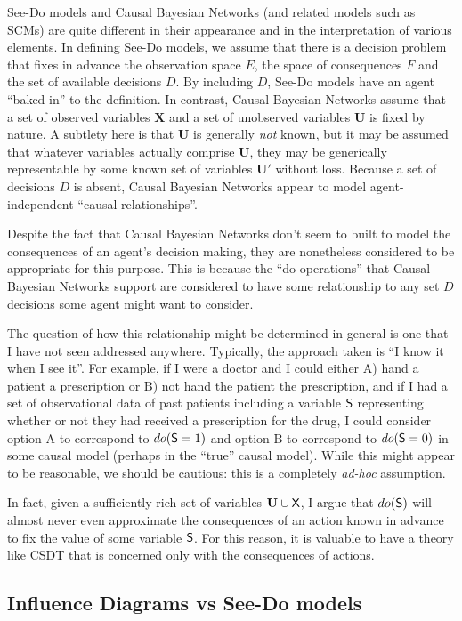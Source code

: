 See-Do models and Causal Bayesian Networks (and related models such as SCMs) are quite different in their appearance and in the interpretation of various elements. In defining See-Do models, we assume that there is a decision problem that fixes in advance the observation space $E$, the space of consequences $F$ and the set of available decisions $D$. By including $D$, See-Do models have an agent ``baked in'' to the definition. In contrast, Causal Bayesian Networks assume that a set of observed variables $\mathbf{X}$ and a set of unobserved variables $\mathbf{U}$ is fixed by nature. A subtlety here is that $\mathbf{U}$ is generally \emph{not} known, but it may be assumed that whatever variables actually comprise $\mathbf{U}$, they may be generically representable by some known set of variables $\mathbf{U}'$ without loss. Because a set of decisions $D$ is absent, Causal Bayesian Networks appear to model agent-independent ``causal relationships''.

Despite the fact that Causal Bayesian Networks don't seem to built to model the consequences of an agent's decision making, they are nonetheless considered to be appropriate for this purpose. This is because the ``do-operations'' that Causal Bayesian Networks support are considered to have some relationship to any set $D$ decisions some agent might want to consider.

The question of how this relationship might be determined in general is one that I have not seen addressed anywhere. Typically, the approach taken is ``I know it when I see it''. For example, if I were a doctor and I could either A) hand a patient a prescription or B) not hand the patient the prescription, and if I had a set of observational data of past patients including a variable $\mathsf{S}$ representing whether or not they had received a prescription for the drug, I could consider option A to correspond to $do(\mathsf{S}=1)$ and option B to correspond to $do(\mathsf{S}=0)$ in some causal model (perhaps in the ``true'' causal model). While this might appear to be reasonable, we should be cautious: this is a completely \emph{ad-hoc} assumption.

In fact, given a sufficiently rich set of variables $\mathbf{U}\cup\mathsf{X}$, I argue that $do(\mathsf{S})$ will almost never even approximate the consequences of an action known in advance to fix the value of some variable $\mathsf{S}$. For this reason, it is valuable to have a theory like CSDT that is concerned only with the consequences of actions.

\subsection{Influence Diagrams vs See-Do models}

